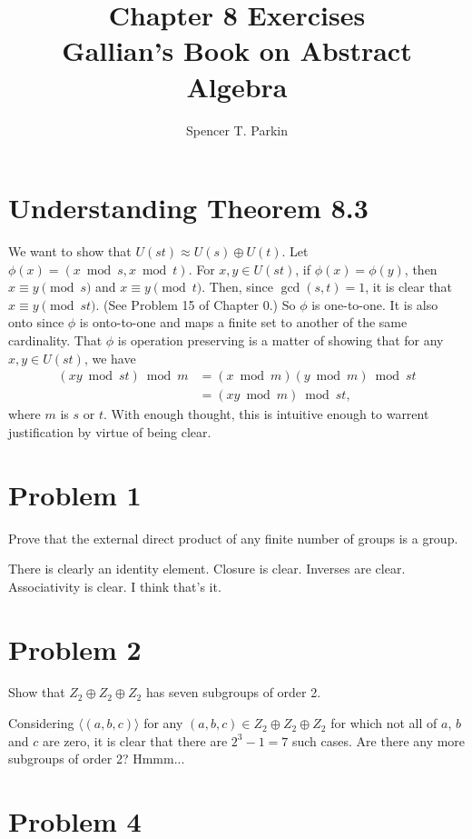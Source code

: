 \documentclass[12pt]{article}
\title{Chapter 8 Exercises\\Gallian's Book on Abstract Algebra}
\author{Spencer T. Parkin}
\begin{document}
\maketitle

\section*{Understanding Theorem 8.3}

We want to show that $U(st)\approx U(s)\oplus U(t)$.
Let $\phi(x)=(x\bmod s,x\bmod t)$.
For $x,y\in U(st)$, if $\phi(x)=\phi(y)$,
then $x\equiv y\pmod s$ and $x\equiv y\pmod t$.
Then, since $\gcd(s,t)=1$, it is clear that $x\equiv y\pmod{st}$.
(See Problem 15 of Chapter 0.)  So $\phi$ is one-to-one.
It is also onto since $\phi$ is onto-to-one and maps a finite
set to another of the same cardinality.  That $\phi$ is
operation preserving is a matter of showing that for
any $x,y\in U(st)$, we have
\begin{align*}
(xy\bmod st)\bmod m &= (x\bmod m)(y\bmod m)\bmod st \\
 &= (xy\bmod m)\bmod st,
\end{align*}
where $m$ is $s$ or $t$.  With enough thought, this is
intuitive enough to warrent justification by virtue of being clear.

\section*{Problem 1}

Prove that the external direct product of any finite number of groups is a group.

There is clearly an identity element.  Closure is clear.  Inverses are clear.
Associativity is clear.  I think that's it.

\section*{Problem 2}

Show that $Z_2\oplus Z_2\oplus Z_2$ has seven subgroups of order 2.

Considering $\langle (a,b,c)\rangle$ for any $(a,b,c)\in Z_2\oplus Z_2\oplus Z_2$
for which not all of $a$, $b$ and $c$ are zero, it is clear that there are $2^3-1=7$
such cases.  Are there any more subgroups of order 2?  Hmmm...

\section*{Problem 4}
\end{document}
